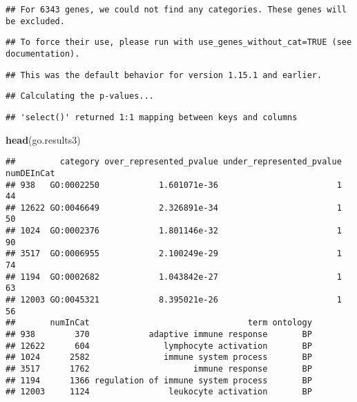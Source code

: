 \documentclass[
]{article}
\newenvironment{Shaded}{\begin{snugshade}}{\end{snugshade}}
\newcommand{\DataTypeTok}[1]{\textcolor[rgb]{0.13,0.29,0.53}{#1}}
\newcommand{\DecValTok}[1]{\textcolor[rgb]{0.00,0.00,0.81}{#1}}
\newcommand{\KeywordTok}[1]{\textcolor[rgb]{0.13,0.29,0.53}{\textbf{#1}}}
\newcommand{\NormalTok}[1]{#1}
\newcommand{\OperatorTok}[1]{\textcolor[rgb]{0.81,0.36,0.00}{\textbf{#1}}}
\newcommand{\StringTok}[1]{\textcolor[rgb]{0.31,0.60,0.02}{#1}}
\begin{document}
\begin{verbatim}
## For 6343 genes, we could not find any categories. These genes will be excluded.
\end{verbatim}

\begin{verbatim}
## To force their use, please run with use_genes_without_cat=TRUE (see documentation).
\end{verbatim}

\begin{verbatim}
## This was the default behavior for version 1.15.1 and earlier.
\end{verbatim}

\begin{verbatim}
## Calculating the p-values...
\end{verbatim}

\begin{verbatim}
## 'select()' returned 1:1 mapping between keys and columns
\end{verbatim}

\begin{Shaded}
\begin{Highlighting}[]
\KeywordTok{head}\NormalTok{(go.results3)}
\end{Highlighting}
\end{Shaded}

\begin{verbatim}
##         category over_represented_pvalue under_represented_pvalue numDEInCat
## 938   GO:0002250            1.601071e-36                        1         44
## 12622 GO:0046649            2.326891e-34                        1         50
## 1024  GO:0002376            1.801146e-32                        1         90
## 3517  GO:0006955            2.100249e-29                        1         74
## 1194  GO:0002682            1.043842e-27                        1         63
## 12003 GO:0045321            8.395021e-26                        1         56
##       numInCat                                term ontology
## 938        370            adaptive immune response       BP
## 12622      604               lymphocyte activation       BP
## 1024      2582               immune system process       BP
## 3517      1762                     immune response       BP
## 1194      1366 regulation of immune system process       BP
## 12003     1124                leukocyte activation       BP
\end{verbatim}

\begin{Shaded}
\end{Shaded}
\end{document}
